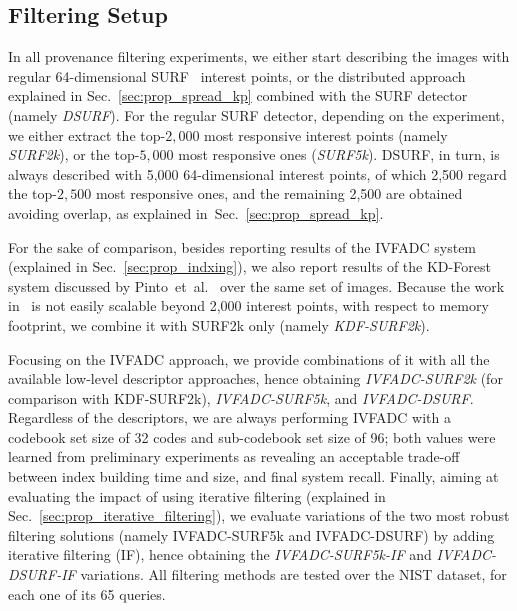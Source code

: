 \subsection{Filtering Setup}
\label{sec:exp_p1}
In all provenance filtering experiments, we either start describing the images with regular 64-dimensional SURF~\cite{Bay:CVIU:2008} interest points, or the distributed approach explained in Sec.~\ref{sec:prop_spread_kp} combined with the SURF detector (namely \emph{DSURF}).
For the regular SURF detector, depending on the experiment, we either extract the top-$2,000$ most responsive interest points (namely \emph{SURF2k}), or the top-$5,000$ most responsive ones (\emph{SURF5k}).
DSURF, in turn, is always described with 5,000 64-dimensional interest points, of which 2,500 regard the top-$2,500$ most responsive ones, and the remaining 2,500 are obtained avoiding overlap, as explained in~Sec.~\ref{sec:prop_spread_kp}.

For the sake of comparison, besides reporting results of the IVFADC system (explained in Sec.~\ref{sec:prop_indxing}), we also report results of the KD-Forest system discussed by Pinto~et~al.~\cite{pinto2017filtering} over the same set of images.
Because the work in~\cite{pinto2017filtering} is not easily scalable beyond 2,000 interest points, with respect to memory footprint, we combine it with SURF2k only (namely \emph{KDF-SURF2k}).

Focusing on the IVFADC approach, we provide combinations of it with all the available low-level descriptor approaches, hence obtaining \emph{IVFADC-SURF2k} (for comparison with KDF-SURF2k), \emph{IVFADC-SURF5k}, and \emph{IVFADC-DSURF}.
Regardless of the descriptors, we are always performing IVFADC with a codebook set size of 32 codes and sub-codebook set size of 96; both values were learned from preliminary experiments as revealing an acceptable trade-off between index building time and size, and final system recall. 
Finally, aiming at evaluating the impact of using iterative filtering (explained in Sec.~\ref{sec:prop_iterative_filtering}), we evaluate variations of the two most robust filtering solutions (namely IVFADC-SURF5k and IVFADC-DSURF) by adding iterative filtering (IF), hence obtaining the \emph{IVFADC-SURF5k-IF} and \emph{IVFADC-DSURF-IF} variations.
All filtering methods are tested over the NIST dataset, for each one of its 65 queries.

